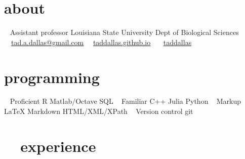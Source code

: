 \documentclass[]{CV}
\begin{document}


\begin{aside}
  \section{about}
    ~
		Assistant professor
		Louisiana State University
		Dept of Biological Sciences
    ~
    \faEnvelope \ \  \href{mailto:tad.a.dallas@gmail.com}{tad.a.dallas@gmail.com}
    \faDesktop  \ \ \href{https://taddallas.github.io}{taddallas.github.io}
    \faGithub   \ \ \ \href{http://github.com/taddallas}{taddallas}
    ~
  \section{programming}
   ~
   {\mefont Proficient}
   R
   Matlab/Octave
   SQL
   ~
   {\mefont Familiar }
   C++
   Julia
   Python
   ~
   {\mefont Markup}
   \LaTeX
   Markdown
   HTML/XML/XPath
   ~
   {\mefont Version control}
   git
\end{aside}





\section{\faFlask \ \ experience}
\end{document}
